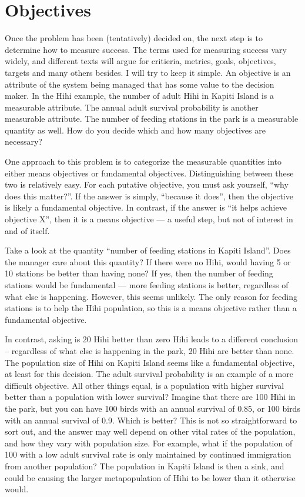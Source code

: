 \documentclass[]{book}
\begin{document}
\section{Objectives}\label{objectives}

Once the problem has been (tentatively) decided on, the next step is to
determine how to measure success. The terms used for measuring success
vary widely, and different texts will argue for critieria, metrics,
goals, objectives, targets and many others besides. I will try to keep
it simple. An objective is an attribute of the system being managed that
has some value to the decision maker. In the Hihi example, the number of
adult Hihi in Kapiti Island is a measurable attribute. The annual adult
survival probability is another measurable attribute. The number of
feeding stations in the park is a measurable quantity as well. How do
you decide which and how many objectives are necessary?

One approach to this problem is to categorize the measurable quantities
into either means objectives or fundamental objectives. Distinguishing
between these two is relatively easy. For each putative objective, you
must ask yourself, ``why does this matter?''. If the answer is simply,
``because it does'', then the objective is likely a fundamental
objective. In contrast, if the answer is ``it helps achieve objective
X'', then it is a means objective --- a useful step, but not of interest
in and of itself.

Take a look at the quantity ``number of feeding stations in Kapiti
Island''. Does the manager care about this quantity? If there were no
Hihi, would having 5 or 10 stations be better than having none? If yes,
then the number of feeding stations would be fundamental --- more
feeding stations is better, regardless of what else is happening.
However, this seems unlikely. The only reason for feeding stations is to
help the Hihi population, so this is a means objective rather than a
fundamental objective.

In contrast, asking is 20 Hihi better than zero Hihi leads to a
different conclusion -- regardless of what else is happening in the
park, 20 Hihi are better than none. The population size of Hihi on
Kapiti Island seems like a fundamental objective, at least for this
decision. The adult survival probability is an example of a more
difficult objective. All other things equal, is a population with higher
survival better than a population with lower survival? Imagine that
there are 100 Hihi in the park, but you can have 100 birds with an
annual survival of 0.85, or 100 birds with an annual survival of 0.9.
Which is better? This is not so straightforward to sort out, and the
answer may well depend on other vital rates of the population, and how
they vary with population size. For example, what if the population of
100 with a low adult survival rate is only maintained by continued
immigration from another population? The population in Kapiti Island is
then a sink, and could be causing the larger metapopulation of Hihi to
be lower than it otherwise would.
\end{document}
